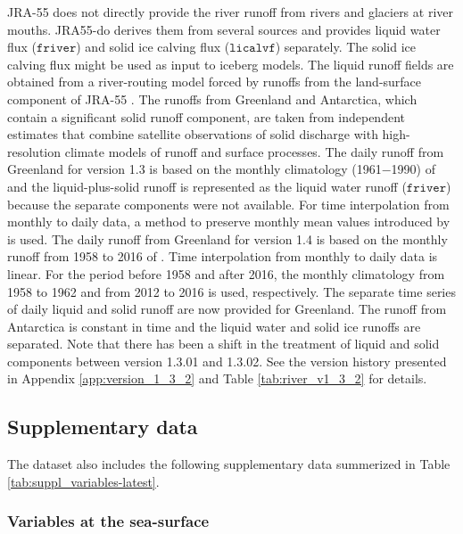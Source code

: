 \documentclass[dvipdfmx]{elsarticle_mod}
\begin{document}
JRA-55 does not directly provide the river runoff from rivers and glaciers at river mouths. JRA55-do derives them from several sources and provides liquid water flux ($\mathtt{friver}$) and solid ice calving flux ($\mathtt{licalvf}$) separately. The solid ice calving flux might be used as input to iceberg models. The liquid runoff fields are obtained from a river-routing model forced by runoffs from the land-surface component of JRA-55 \citep{Suzuki_et_al_2018}. The runoffs from Greenland and Antarctica, which contain a significant solid runoff component, are taken from independent estimates that combine satellite observations of solid discharge with high-resolution climate models of runoff and surface processes. The daily runoff from Greenland for version 1.3 is based on the monthly climatology (1961$-$1990) of \citet{Bamber_et_al_2012} and the liquid-plus-solid runoff is represented as the liquid water runoff ($\mathtt{friver}$) because the separate components were not available. For time interpolation from monthly to daily data, a method to preserve monthly mean values introduced by \citet{Killworth_1996} is used. The daily runoff from Greenland for version 1.4 is based on the monthly runoff from 1958 to 2016 of \citet{Bamber_et_al_2018}. Time interpolation from monthly to daily data is linear. For the period before 1958 and after 2016, the monthly climatology from 1958 to 1962 and from 2012 to 2016 is used, respectively. The separate time series of daily liquid and solid runoff are now provided for Greenland. The runoff from Antarctica \citep{Depoorter_et_al_2013} is constant in time and the liquid water and solid ice runoffs are separated. Note that there has been a shift in the treatment of liquid and solid components between version 1.3.01 and 1.3.02. See the version history presented in Appendix \ref{app:version_1_3_2} and Table \ref{tab:river_v1_3_2} for details.


\subsection{Supplementary data}

The dataset also includes the following supplementary data summerized in Table \ref{tab:suppl_variables-latest}.

\subsubsection{Variables at the sea-surface}
\end{document}
